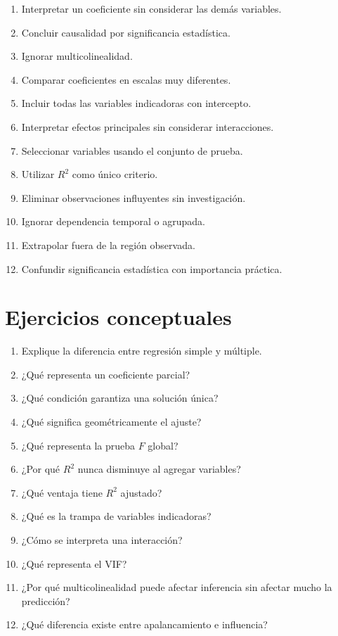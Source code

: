 \documentclass[
  spanish,
  10.5pt,
  letterpaper,
  DIV=11,
  numbers=noendperiod,
  oneside,
  open=any]{scrreprt}
\providecommand{\tightlist}{%
  \setlength{\itemsep}{0pt}\setlength{\parskip}{0pt}}
\theoremstyle{definition}
\theoremstyle{definition}
\theoremstyle{plain}
\theoremstyle{remark}
\begin{document}
\begin{enumerate}
\def\labelenumi{\arabic{enumi}.}
\tightlist
\item
  Interpretar un coeficiente sin considerar las demás variables.
\item
  Concluir causalidad por significancia estadística.
\item
  Ignorar multicolinealidad.
\item
  Comparar coeficientes en escalas muy diferentes.
\item
  Incluir todas las variables indicadoras con intercepto.
\item
  Interpretar efectos principales sin considerar interacciones.
\item
  Seleccionar variables usando el conjunto de prueba.
\item
  Utilizar \(R^2\) como único criterio.
\item
  Eliminar observaciones influyentes sin investigación.
\item
  Ignorar dependencia temporal o agrupada.
\item
  Extrapolar fuera de la región observada.
\item
  Confundir significancia estadística con importancia práctica.
\end{enumerate}

\section*{Ejercicios conceptuales}\label{ejercicios-conceptuales-8}


\begin{enumerate}
\def\labelenumi{\arabic{enumi}.}
\tightlist
\item
  Explique la diferencia entre regresión simple y múltiple.
\item
  ¿Qué representa un coeficiente parcial?
\item
  ¿Qué condición garantiza una solución única?
\item
  ¿Qué significa geométricamente el ajuste?
\item
  ¿Qué representa la prueba \(F\) global?
\item
  ¿Por qué \(R^2\) nunca disminuye al agregar variables?
\item
  ¿Qué ventaja tiene \(R^2\) ajustado?
\item
  ¿Qué es la trampa de variables indicadoras?
\item
  ¿Cómo se interpreta una interacción?
\item
  ¿Qué representa el VIF?
\item
  ¿Por qué multicolinealidad puede afectar inferencia sin afectar mucho
  la predicción?
\item
  ¿Qué diferencia existe entre apalancamiento e influencia?
\end{enumerate}
\end{document}
